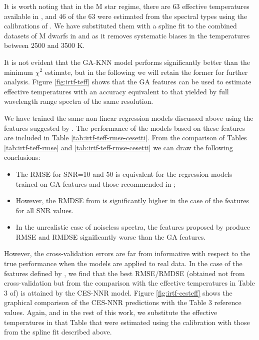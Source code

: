 It is worth noting that in the M star regime, there are 63 effective
temperatures available in \cite{cesetti}, and 46 of the 63 were
estimated from the spectral types using the calibrations
of \cite{1996imsa.book.....O}. We have substituted them with a spline
fit to the combined datasets of M dwarfs in \cite{2013A&A...556A..15R}
and \cite{2012ApJ...757..112B} as it removes systematic biases in the
temperatures between 2500 and 3500 K.

It is not evident that the GA-KNN model performs significantly better
than the minimum $\chi^2$ estimate, but in the following we will
retain the former for further analysis. Figure \ref{fig:irtf-teff}
shows that the GA features can be used to estimate effective
temperatures with an accuracy equivalent to that yielded by full
wavelength range spectra of the same resolution.


We have trained the same non linear regression models discussed above
using the features suggested by \cite{cesetti}. The performance of the
models based on these features are included in Table
\ref{tab:irtf-teff-rmse-cesetti}. From the comparison of Tables
\ref{tab:irtf-teff-rmse} and
\ref{tab:irtf-teff-rmse-cesetti} we can draw the following conclusions:

\begin{itemize}

\item The RMSE for SNR=10 and 50 is equivalent for the regression
  models trained on GA features and those recommended
  in \cite{cesetti};

\item However, the RMDSE from \cite{cesetti} is significantly higher
  in the case of the features for all SNR values.

\item In the unrealistic case of noiseless spectra, the features proposed
  by \cite{cesetti} produce RMSE and RMDSE significantly worse than
  the GA features.

\end{itemize}

However, the cross-validation errors are far from informative with
respect to the true performance when the models are applied to real
data. In the case of the features defined by \cite{cesetti}, we find
that the best RMSE/RMDSE (obtained not from cross-validation but from
the comparison with the effective temperatures in Table 3
of\cite{cesetti}) is attained by the CES-NNR
model. Figure \ref{fig:irtf-cesteff} shows the graphical comparison of
the CES-NNR predictions with the Table 3 reference values. Again, and
in the rest of this work, we substitute the effective temperatures in
that Table that were estimated using the \cite{1996imsa.book.....O}
calibration with those from the spline fit described above.

